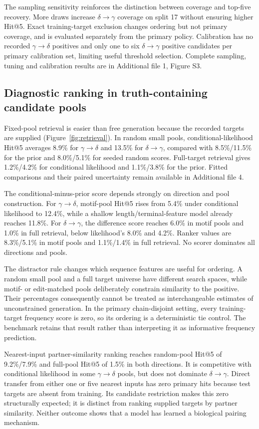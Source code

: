 \documentclass[a4paper,11pt]{article}
\newcommand{\gtd}{\mbox{\ensuremath{\gamma\!\rightarrow\!\delta}}}
\newcommand{\dtg}{\mbox{\ensuremath{\delta\!\rightarrow\!\gamma}}}
\begin{document}
The sampling sensitivity reinforces the distinction between coverage and
top-five recovery. More draws increase \dtg{} coverage on split 17 without
ensuring higher Hit@5. Exact training-target exclusion changes ordering but
not primary coverage, and is evaluated separately from the primary policy.
Calibration has no recorded \gtd{} positives and only one to six \dtg{}
positive candidates per primary calibration set, limiting useful threshold
selection. Complete sampling, tuning and calibration results are in
Additional file 1, Figure S3.

\subsection{Diagnostic ranking in truth-containing candidate pools}
Fixed-pool retrieval is easier than free generation because the recorded
targets are supplied (Figure~\ref{fig:retrieval}). In random small pools,
conditional-likelihood Hit@5 averages 8.9\% for \gtd{} and 13.5\% for
\dtg{}, compared with 8.5\%/11.5\% for the prior and 8.0\%/5.1\% for seeded
random scores. Full-target retrieval gives 1.2\%/4.2\% for conditional
likelihood and 1.1\%/3.8\% for the prior. Fitted comparisons and their paired
uncertainty remain available in Additional file 4.

The conditional-minus-prior score depends strongly on direction and pool
construction. For \gtd{}, motif-pool Hit@5 rises from 5.4\% under
conditional likelihood to 12.4\%, while a shallow length/terminal-feature
model already reaches 11.8\%. For \dtg{}, the difference score reaches
6.0\% in motif pools and 1.0\% in full retrieval, below likelihood's
8.0\% and 4.2\%. Ranker values are 8.3\%/5.1\% in motif pools and
1.1\%/1.4\% in full retrieval. No scorer dominates all directions and pools.

The distractor rule changes which sequence features are useful for ordering.
A random small pool and a full target universe have different search spaces,
while motif- or edit-matched pools deliberately constrain similarity to the
positive. Their percentages consequently cannot be treated as interchangeable
estimates of unconstrained generation. In the primary chain-disjoint setting,
every training-target frequency score is zero, so its ordering is a
deterministic tie control. The benchmark retains that result rather than
interpreting it as informative frequency prediction.

Nearest-input partner-similarity ranking reaches random-pool Hit@5 of
9.2\%/7.9\% and full-pool Hit@5 of 1.5\% in both directions. It is
competitive with conditional likelihood in some \gtd{} pools, but does not
dominate \dtg{}. Direct transfer from either one or five nearest inputs has
zero primary hits because test targets are absent from training.
Its candidate restriction makes this zero structurally expected; it is
distinct from ranking supplied targets by partner similarity.
Neither outcome shows that a model has learned a biological pairing mechanism.
\end{document}
